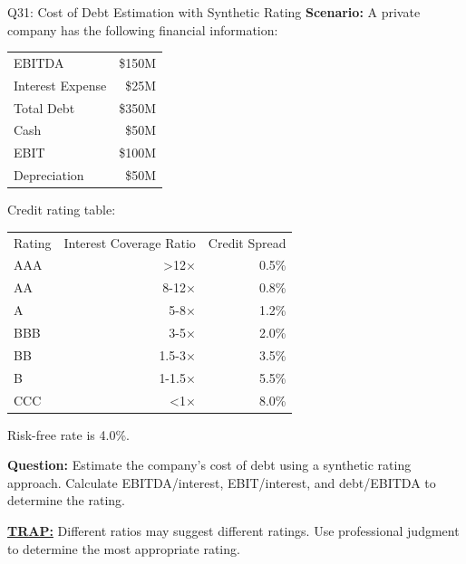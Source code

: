 \documentclass{beamer}
\renewcommand{\scriptsize}{\fontsize{6pt}{7pt}\selectfont}
\begin{document}
	\begin{frame}{Q31: Cost of Debt Estimation with Synthetic Rating}
		\scriptsize
		\textbf{Scenario:} A private company has the following financial information:
		
		\begin{tabular}{lr}
			EBITDA & \$150M \\
			Interest Expense & \$25M \\
			Total Debt & \$350M \\
			Cash & \$50M \\
			EBIT & \$100M \\
			Depreciation & \$50M \\
		\end{tabular}
		
		Credit rating table:
		
		\begin{tabular}{lrr}
			Rating & Interest Coverage Ratio & Credit Spread \\
			AAA & >12× & 0.5\% \\
			AA & 8-12× & 0.8\% \\
			A & 5-8× & 1.2\% \\
			BBB & 3-5× & 2.0\% \\
			BB & 1.5-3× & 3.5\% \\
			B & 1-1.5× & 5.5\% \\
			CCC & <1× & 8.0\% \\
		\end{tabular}
		
		Risk-free rate is 4.0\%.
		
		\textbf{Question:} Estimate the company's cost of debt using a synthetic rating approach. Calculate EBITDA/interest, EBIT/interest, and debt/EBITDA to determine the rating.
		
		\vspace{2pt}
		\underline{\textbf{TRAP:}} Different ratios may suggest different ratings. Use professional judgment to determine the most appropriate rating.
	\end{frame}
	
\end{document}
